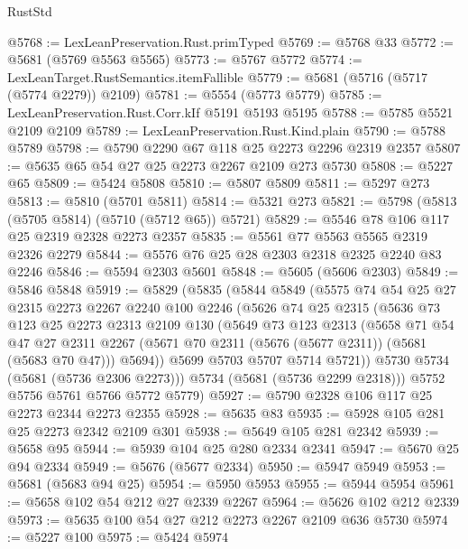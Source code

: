 \begin{lexlean}{RustStd}
\begin{coremodule}
@5768 := LexLeanPreservation.Rust.primTyped
@5769 := @5768 @33
@5772 := @5681 (@5769 @5563 @5565)
@5773 := @5767 @5772
@5774 := LexLeanTarget.RustSemantics.itemFallible
@5779 := @5681 (@5716 (@5717 (@5774 @2279)) @2109)
@5781 := @5554 (@5773 @5779)
@5785 := LexLeanPreservation.Rust.Corr.kIf @5191 @5193 @5195
@5788 := @5785 @5521 @2109 @2109
@5789 := LexLeanPreservation.Rust.Kind.plain
@5790 := @5788 @5789
@5798 := @5790 @2290 @67 @118 @25 @2273 @2296 @2319 @2357
@5807 := @5635 @65 @54 @27 @25 @2273 @2267 @2109 @273 @5730
@5808 := @5227 @65
@5809 := @5424 @5808
@5810 := @5807 @5809
@5811 := @5297 @273
@5813 := @5810 (@5701 @5811)
@5814 := @5321 @273
@5821 := @5798 (@5813 (@5705 @5814) (@5710 (@5712 @65)) @5721)
@5829 := @5546 @78 @106 @117 @25 @2319 @2328 @2273 @2357
@5835 := @5561 @77 @5563 @5565 @2319 @2326 @2279
@5844 := @5576 @76 @25 @28 @2303 @2318 @2325 @2240 @83 @2246
@5846 := @5594 @2303 @5601
@5848 := @5605 (@5606 @2303)
@5849 := @5846 @5848
@5919 := @5829
    (@5835
      (@5844
        @5849
        (@5575
          @74
          @54
          @25
          @27
          @2315
          @2273
          @2267
          @2240
          @100
          @2246
          (@5626
            @74
            @25
            @2315
            (@5636
              @73
              @123
              @25
              @2273
              @2313
              @2109
              @130
              (@5649
                @73
                @123
                @2313
                (@5658
                  @71
                  @54
                  @47
                  @27
                  @2311
                  @2267
                  (@5671 @70 @2311 (@5676 (@5677 @2311)) (@5681 (@5683 @70 @47)))
                  @5694))
              @5699
              @5703
              @5707
              @5714
              @5721))
          @5730
          @5734
          (@5681 (@5736 @2306 @2273)))
        @5734
        (@5681 (@5736 @2299 @2318)))
      @5752
      @5756
      @5761
      @5766
      @5772
      @5779)
@5927 := @5790 @2328 @106 @117 @25 @2273 @2344 @2273 @2355
@5928 := @5635 @83
@5935 := @5928 @105 @281 @25 @2273 @2342 @2109 @301
@5938 := @5649 @105 @281 @2342
@5939 := @5658 @95
@5944 := @5939 @104 @25 @280 @2334 @2341
@5947 := @5670 @25 @94 @2334
@5949 := @5676 (@5677 @2334)
@5950 := @5947 @5949
@5953 := @5681 (@5683 @94 @25)
@5954 := @5950 @5953
@5955 := @5944 @5954
@5961 := @5658 @102 @54 @212 @27 @2339 @2267
@5964 := @5626 @102 @212 @2339
@5973 := @5635 @100 @54 @27 @212 @2273 @2267 @2109 @636 @5730
@5974 := @5227 @100
@5975 := @5424 @5974

\end{coremodule}
\end{lexlean}
